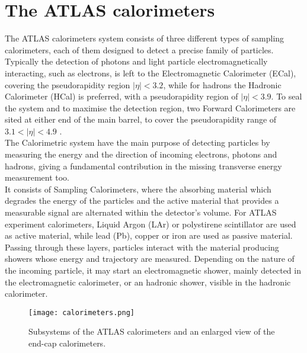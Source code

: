 \section{The ATLAS calorimeters}
The ATLAS calorimeters system consists of three different types of sampling calorimeters, each of them designed to detect a precise family of particles. Typically the detection of photons and light particle electromagnetically interacting, such as electrons, is left to the Electromagnetic Calorimeter (ECal), covering the pseudorapidity region $|\eta| < 3.2$, while for hadrons the Hadronic Calorimeter (HCal) is preferred, with a pseudorapidity region of $|\eta| < 3.9$. To seal the system and to maximise the detection region, two Forward Calorimeters are sited at either end of the main barrel, to cover the pseudorapidity range of $3.1 < |\eta| < 4.9$ .
\\
The Calorimetric system have the main purpose of detecting particles by measuring the energy and the direction of incoming electrons, photons and hadrons, giving a fundamental contribution in the missing transverse energy measurement too.
\\
It consists of Sampling Calorimeters, where the absorbing material which degrades the energy of the particles and the active material that provides a measurable signal are alternated within the detector's volume. For ATLAS experiment calorimeters, Liquid Argon (LAr) or polystirene scintillator are used as active material, while lead (Pb), copper or iron are used as passive material.
\\
Passing through these layers, particles interact with the material producing showers whose energy and trajectory are measured. Depending on the nature of the incoming particle, it may start an electromagnetic shower, mainly detected in the electromagnetic calorimeter, or an hadronic shower, visible in the hadronic calorimeter.
\begin{figure}[h]
\centering
\texttt{[image: calorimeters.png]}
\caption{Subsystems of the ATLAS calorimeters and an enlarged view of the end-cap calorimeters.}
\end{figure}
